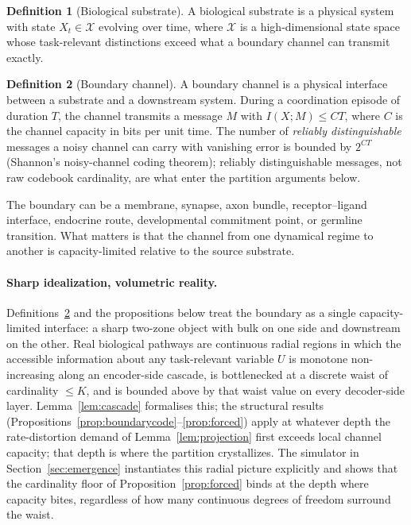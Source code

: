 \documentclass[12pt]{article}
\theoremstyle{definition}
\newtheorem{definition}{Definition}
\newcommand{\X}{\mathcal{X}}
\newcommand{\I}{I}
\newcommand{\C}{C}
\begin{document}
\begin{definition}[Biological substrate]
A biological substrate is a physical system with state $X_t \in \X$ evolving over time, where $\X$ is a high-dimensional state space whose task-relevant distinctions exceed what a boundary channel can transmit exactly.
\end{definition}

\begin{definition}[Boundary channel]
\label{def:boundarychannel}
A boundary channel is a physical interface between a substrate and a downstream system. During a coordination episode of duration $T$, the channel transmits a message $M$ with $\I(X;M) \leq \C T$, where $\C$ is the channel capacity in bits per unit time. The number of \emph{reliably distinguishable} messages a noisy channel can carry with vanishing error is bounded by $2^{\C T}$ (Shannon's noisy-channel coding theorem); reliably distinguishable messages, not raw codebook cardinality, are what enter the partition arguments below.
\end{definition}

The boundary can be a membrane, synapse, axon bundle, receptor--ligand interface, endocrine route, developmental commitment point, or germline transition. What matters is that the channel from one dynamical regime to another is capacity-limited relative to the source substrate.

\paragraph{Sharp idealization, volumetric reality.} Definitions~\ref{def:boundarychannel} and the propositions below treat the boundary as a single capacity-limited interface: a sharp two-zone object with bulk on one side and downstream on the other. Real biological pathways are continuous radial regions in which the accessible information about any task-relevant variable $U$ is monotone non-increasing along an encoder-side cascade, is bottlenecked at a discrete waist of cardinality $\leq K$, and is bounded above by that waist value on every decoder-side layer. Lemma~\ref{lem:cascade} formalises this; the structural results (Propositions~\ref{prop:boundarycode}--\ref{prop:forced}) apply at whatever depth the rate-distortion demand of Lemma~\ref{lem:projection} first exceeds local channel capacity; that depth is where the partition crystallizes. The simulator in Section~\ref{sec:emergence} instantiates this radial picture explicitly and shows that the cardinality floor of Proposition~\ref{prop:forced} binds at the depth where capacity bites, regardless of how many continuous degrees of freedom surround the waist.
\end{document}
